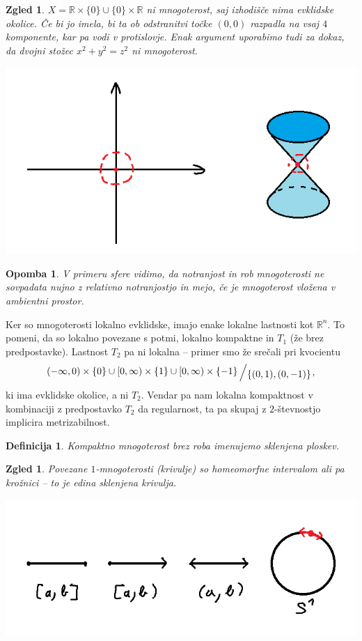 \documentclass[10pt, a4paper]{article}
\newtheorem{defi}[izr]{Definicija}
\newenvironment{noticeB}{%
  \tcolorbox[%
  notitle,
  empty,
  enhanced,  %
  breakable,
  coltext=black,
  colback=white, 
  fontupper=\rmfamily,
  noparskip,
  sharp corners,
  boxrule=-1pt,  %
  frame hidden,
  left=7pt,  %
  right=7pt,
  top=5pt,
  bottom=5pt,
  before skip=2.5ex plus 2pt,
  after skip=2.5ex plus 2pt,
  borderline west = {1.5pt}{-0.1pt}{blue!30!black}, %
  overlay unbroken and last={%
    \draw[color=black, line width=1.25pt]
    ($(frame.south west)+(1.pt, -0.1pt)$) -- ++(2em, 0);
  }
  ]}
{\endtcolorbox}
\newenvironment{definicija}{\begin{noticeB}\begin{defi}}{%
\end{defi}\end{noticeB}}
\newtheorem*{opomba}{Opomba}
\newtheorem{zgled}[izr]{Zgled}
\newcommand{\R}{\mathbb {R}}
\newcommand{\quot}[2]{{\raisebox{0.1em}{$#1$}\left/\raisebox{-0.2em}{$#2$}\right.}}
\begin{document}
\begin{zgled}
  $X = \R \times \{0\} \cup \{0\} \times \R$ ni mnogoterost, saj izhodišče nima evklidske okolice. 
  Če bi jo imela, bi ta ob odstranitvi točke $(0, 0)$ razpadla na vsaj $4$ komponente, kar pa vodi v protislovje.
  Enak argument uporabimo tudi za dokaz, da dvojni stožec $x^2 + y^2 = z^2$ ni mnogoterost.  
  \begin{center}
    \includegraphics{zgled8.png}
  \end{center}
\end{zgled}

\begin{opomba}
  V primeru sfere vidimo, da notranjost in rob mnogoterosti ne sovpadata nujno z relativno
  notranjostjo in mejo, če je mnogoterost vložena v ambientni prostor.
\end{opomba}

Ker so mnogoterosti lokalno evklidske, imajo enake lokalne lastnosti kot $\R^n$.
To pomeni, da so lokalno povezane s potmi, lokalno kompaktne in $T_1$ (že brez predpostavke).
Lastnost $T_2$ pa ni lokalna -- primer smo že srečali pri kvocientu $$\quot{(-\infty, 0)\times \{0\} \cup [0, \infty)\times \{1\} \cup [0,\infty)\times\{-1\}}{\{(0, 1), (0, -1)\}},$$
ki ima evklidske okolice, a ni $T_2$. Vendar pa nam lokalna kompaktnost v kombinaciji 
z predpostavko $T_2$ da regularnost, ta pa skupaj z $2$-števnostjo implicira metrizabilnost.

\begin{definicija}
  Kompaktno mnogoterost brez roba imenujemo sklenjena ploskev.
\end{definicija}

\begin{zgled} 
    Povezane $1$-mnogoterosti (krivulje) so homeomorfne intervalom 
    ali pa krožnici -- to je edina sklenjena krivulja.
    \begin{center}
      \includegraphics[scale=0.6]{zgled9.png}
    \end{center}
  \end{zgled}
\end{document}

